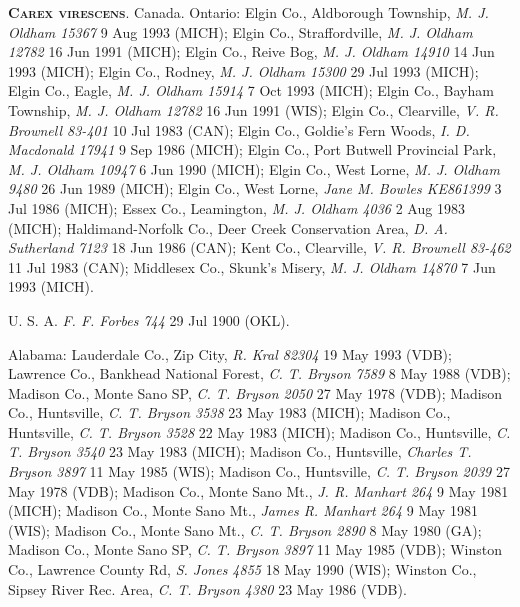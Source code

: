 \documentclass{article}
\begin{document}
\textbf{\textsc{Carex virescens}}. Canada.
Ontario:
Elgin Co., Aldborough Township, \textit{M. J. Oldham 15367} 9 Aug 1993 (MICH);
Elgin Co.,  Straffordville, \textit{M. J. Oldham 12782} 16 Jun 1991 (MICH);
Elgin Co., Reive Bog, \textit{M. J. Oldham 14910} 14 Jun 1993 (MICH);
Elgin Co., Rodney, \textit{M. J. Oldham 15300} 29 Jul 1993 (MICH);
Elgin Co., Eagle, \textit{M. J. Oldham 15914} 7 Oct 1993 (MICH);
Elgin Co., Bayham Township, \textit{M. J. Oldham 12782} 16 Jun 1991 (WIS);
Elgin Co., Clearville, \textit{V. R. Brownell 83-401} 10 Jul 1983 (CAN);
Elgin Co., Goldie's Fern Woods, \textit{I. D. Macdonald 17941} 9 Sep 1986 (MICH);
Elgin Co., Port Butwell Provincial Park, \textit{M. J. Oldham 10947} 6 Jun 1990 (MICH);
Elgin Co., West Lorne, \textit{M. J. Oldham 9480} 26 Jun 1989 (MICH);
Elgin Co., West Lorne, \textit{Jane M. Bowles KE861399} 3 Jul 1986 (MICH);
Essex Co., Leamington, \textit{M. J. Oldham 4036} 2 Aug 1983 (MICH);
Haldimand-Norfolk Co., Deer Creek Conservation Area, \textit{D. A. Sutherland 7123} 18 Jun 1986 (CAN);
Kent Co., Clearville, \textit{V. R. Brownell 83-462} 11 Jul 1983 (CAN);
Middlesex Co., Skunk's Misery, \textit{M. J. Oldham 14870} 7 Jun 1993 (MICH).

U. S. A.
\textit{F. F. Forbes 744} 29 Jul 1900 (OKL).

Alabama:
Lauderdale Co.,  Zip City, \textit{R. Kral 82304} 19 May 1993 (VDB);
Lawrence Co., Bankhead National Forest, \textit{C. T. Bryson 7589} 8 May 1988 (VDB);
Madison Co., Monte Sano SP, \textit{C. T. Bryson 2050} 27 May 1978 (VDB);
Madison Co., Huntsville, \textit{C. T. Bryson 3538} 23 May 1983 (MICH);
Madison Co., Huntsville, \textit{C. T. Bryson 3528} 22 May 1983 (MICH);
Madison Co., Huntsville, \textit{C. T. Bryson 3540} 23 May 1983 (MICH);
Madison Co., Huntsville, \textit{Charles T. Bryson 3897} 11 May 1985 (WIS);
Madison Co., Huntsville, \textit{C. T. Bryson 2039} 27 May 1978 (VDB);
Madison Co., Monte Sano Mt., \textit{J. R. Manhart 264} 9 May 1981 (MICH);
Madison Co., Monte Sano Mt., \textit{James R. Manhart 264} 9 May 1981 (WIS);
Madison Co., Monte Sano Mt., \textit{C. T. Bryson 2890} 8 May 1980 (GA);
Madison Co., Monte Sano SP, \textit{C. T. Bryson 3897} 11 May 1985 (VDB);
Winston Co., Lawrence County Rd, \textit{S. Jones 4855} 18 May 1990 (WIS);
Winston Co., Sipsey River Rec. Area, \textit{C. T. Bryson 4380} 23 May 1986 (VDB).
\end{document}
